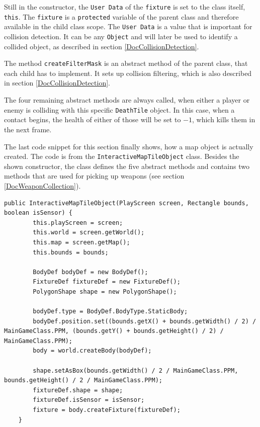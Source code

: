 \documentclass[12p]{article}
\begin{document}
Still in the constructor, the \texttt{User Data} of the \texttt{fixture} is set to the class itself, \texttt{this}. The \texttt{fixture} is a \texttt{protected} variable of the parent class and therefore available in the child class scope. The \texttt{User Data} is a value that is important for collision detection. It can be any \texttt{Object} and will later be used to identify a collided object, as described in section \ref{DocCollisionDetection}.

The method \texttt{createFilterMask} is an abstract method of the parent class, that each child has to implement. It sets up collision filtering, which is also described in section \ref{DocCollisionDetection}.

The four remaining abstract methods are always called, when either a player or enemy is colliding with this specific \texttt{DeathTile} object. In this case, when a contact begins, the health of either of those will be set to $-1$, which kills them in the next frame.

The last code snippet for this section finally shows, how a map object is actually created. The code is from the \texttt{InteractiveMapTileObject} class. Besides the shown constructor, the class defines the five abstract methods and contains two methods that are used for picking up weapons (see section \ref{DocWeaponCollection}).

\begin{verbatim}
public InteractiveMapTileObject(PlayScreen screen, Rectangle bounds, boolean isSensor) {
        this.playScreen = screen;
        this.world = screen.getWorld();
        this.map = screen.getMap();
        this.bounds = bounds;

        BodyDef bodyDef = new BodyDef();
        FixtureDef fixtureDef = new FixtureDef();
        PolygonShape shape = new PolygonShape();

        bodyDef.type = BodyDef.BodyType.StaticBody;
        bodyDef.position.set((bounds.getX() + bounds.getWidth() / 2) / MainGameClass.PPM, (bounds.getY() + bounds.getHeight() / 2) / MainGameClass.PPM);
        body = world.createBody(bodyDef);

        shape.setAsBox(bounds.getWidth() / 2 / MainGameClass.PPM, bounds.getHeight() / 2 / MainGameClass.PPM);
        fixtureDef.shape = shape;
        fixtureDef.isSensor = isSensor;
        fixture = body.createFixture(fixtureDef);
    }
\end{verbatim}
\end{document}
